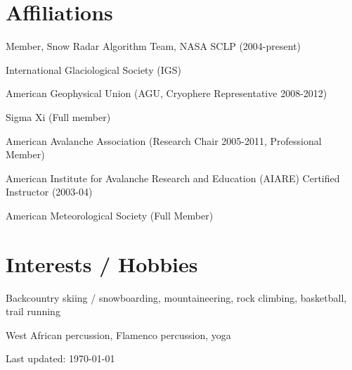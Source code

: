 \documentclass[11pt]{article}
\renewenvironment{itemize}{
  \begin{list}{}{
    \setlength{\leftmargin}{1.5em}
    \setlength{\itemsep}{0pt}
    \setlength{\parskip}{0pt}
  }
}{
  \end{list}
}
\begin{document}
\section*{Affiliations}
\begin{itemize}
\item Member, Snow Radar Algorithm Team, NASA SCLP (2004-present)
\item International Glaciological Society (IGS)
\item American Geophysical Union (AGU, Cryophere Representative 2008-2012)
\item Sigma Xi (Full member)
\item American Avalanche Association (Research Chair 2005-2011, Professional Member)
\item American Institute for Avalanche Research and Education (AIARE) Certified Instructor (2003-04)
\item American Meteorological Society (Full Member)
\end{itemize}


\section*{Interests / Hobbies}
\begin{itemize}
\item Backcountry skiing / snowboarding, mountaineering, rock climbing, basketball, trail running
\item West African percussion, Flamenco percussion, yoga
\end{itemize}


\setlength{\extrarowheight}{5pt}


\bigskip
\begin{center}
  \begin{footnotesize}
    Last updated: \today
  \end{footnotesize}
\end{center}

\end{document}
